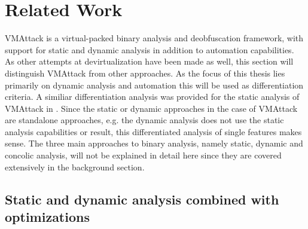 \documentclass[10pt,twoside,a4paper,bibliography=totoc]{scrbook}
\begin{document}
\section{Related Work}
\label{sec1:relwork}
VMAttack is a virtual-packed binary analysis and deobfuscation framework, with support for static and dynamic analysis in addition to automation capabilities. As other attempts at devirtualization have been made as well, this section will distinguish VMAttack from other approaches. As the focus of this thesis lies primarily on dynamic analysis and automation this will be used as differentiation criteria. A similiar differentiation analysis was provided for the static analysis of VMAttack in \cite{Krau:Thesis2016}. Since the static or dynamic approaches in the case of VMAttack are standalone approaches, e.g. the dynamic analysis does not use the static analysis capabilities or result, this differentiated analysis of single features makes sense.
The three main approaches to binary analysis, namely static, dynamic and concolic analysis, will not be explained in detail here since they are covered extensively in the background section. 

\subsection{Static and dynamic analysis combined with optimizations}
\end{document}
